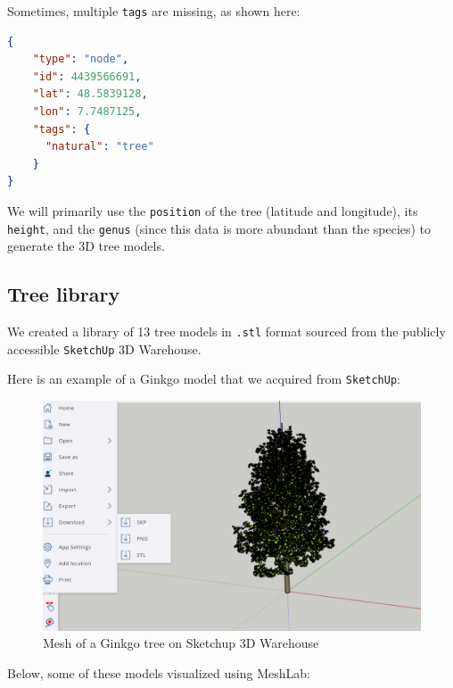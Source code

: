 \documentclass[12pt]{article}
\begin{document}
Sometimes, multiple \texttt{tags} are missing, as shown here:

\begin{lstlisting}[language=json]
{
    "type": "node",
    "id": 4439566691,
    "lat": 48.5839128,
    "lon": 7.7487125,
    "tags": {
      "natural": "tree"
    }
}
\end{lstlisting}

We will primarily use the \texttt{position} of the tree (latitude and
longitude), its \texttt{height}, and the \texttt{genus} (since this data is
more abundant than the species) to generate the 3D tree models.

\newpage

\subsection{Tree library}
We created a library of 13 tree models in \texttt{.stl} format sourced from
the publicly accessible \texttt{SketchUp}\cite{sketchup} 3D Warehouse.

Here is an example of a Ginkgo model that we acquired from \texttt{SketchUp}:

\begin{figure}[H]
    \centering
        \centering
        \includegraphics[width=\textwidth]{images/ginkgo_sketchup.png}
        \caption{Mesh of a Ginkgo tree on Sketchup 3D Warehouse}
\end{figure}

\newpage

Below, some of these models visualized using MeshLab\cite{meshlab}:
\end{document}
